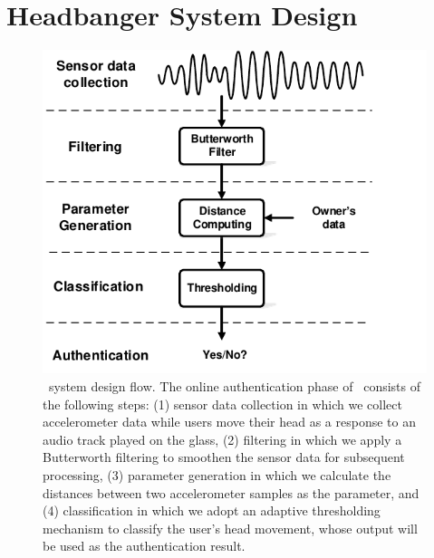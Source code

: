 \section{Headbanger System Design}
\label{sec:design}

\begin{figure}[t]
\centering
\includegraphics[width=0.75\columnwidth]{figure/system.pdf}
\caption{\systemname~system design flow. The online authentication phase of \systemname~consists of the following steps: (1) sensor data collection in which we collect accelerometer data while users move their head as a response to an audio track played on the glass, (2) filtering in which we apply a Butterworth filtering to smoothen the sensor data for subsequent processing, (3) parameter generation in which we calculate the distances between two accelerometer samples as the parameter, and (4) classification in which we adopt an adaptive thresholding mechanism to classify the user's head movement, whose output will be used as the authentication result.}
\label{fig:sysarch}
\end{figure}


